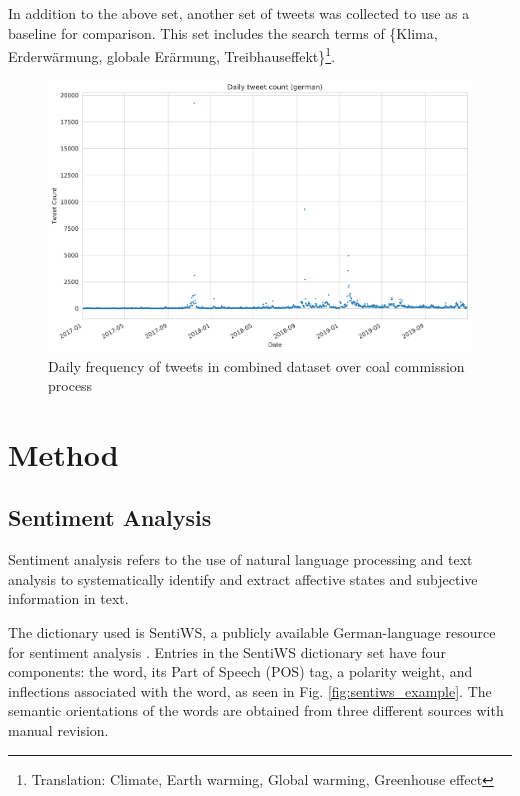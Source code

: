 \documentclass[12pt,onecolumn,twoside]{layout}
\begin{document}
In addition to the above set, another set of tweets was collected to use as a baseline for comparison. This set includes the search terms of \{Klima, Erderwärmung, globale Erärmung, Treibhauseffekt\}\footnote{Translation: Climate, Earth warming, Global warming, Greenhouse effect}.


\begin{figure} 
	\begin{center}
		\includegraphics[width=0.75\linewidth]{figures/sa_tweet_frequency_zoom2}
	\end{center}
	\caption{Daily frequency of tweets in combined dataset over coal commission process}
	\label{fig:tweet_frequency}
\end{figure}

\section*{Method} \label{sec:method}
\subsection*{Sentiment Analysis}

Sentiment analysis refers to the use of natural language processing and text analysis to systematically identify and extract affective states and subjective information in text. %

The dictionary used is SentiWS, a publicly available German-language resource for sentiment analysis \cite{REMUS10.490}. Entries in the SentiWS dictionary set have four components: the word, its Part of Speech (POS) tag, a polarity weight, and inflections associated with the word, as seen in Fig. \ref{fig:sentiws_example}. The semantic orientations of the words are obtained from three different sources with manual revision. 
\end{document}
